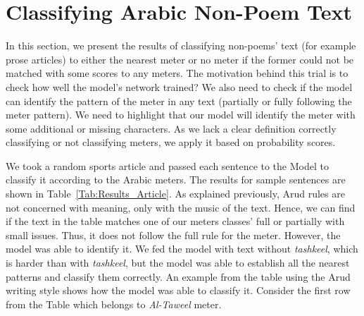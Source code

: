 \section{Classifying Arabic Non-Poem Text}

In this section, we present the results of classifying non-poems’ text (for example prose articles) to either the nearest meter or no meter if the former could not be matched with some scores to any meters. The motivation behind this trial is to check how well the model’s network trained? We also need to check if the model can identify the pattern of the meter in any text (partially or fully following the meter pattern). We need to highlight that our model will identify the meter with some additional or missing characters. As we lack a clear definition correctly classifying or not classifying meters, we apply it based on probability scores.

We took a random sports article and passed each sentence to the Model to classify it according to the Arabic meters. The results for sample sentences are shown in Table~\ref{Tab:Results_Article}. As explained previously, Arud rules are not concerned with meaning, only with the music of the text. Hence, we can find if the text in the table matches one of our meters classes’ full or partially with small issues. Thus, it does not follow the full rule for the meter. However, the model was able to identify it. We fed the model with text without \textit{tashkeel}, which is harder than with \textit{tashkeel}, but the model was able to establish all the nearest patterns and classify them correctly. An example from the table using the Arud writing style shows how the model was able to classify it. Consider the first row from the Table which belongs to \textit{Al-Taweel} meter.


